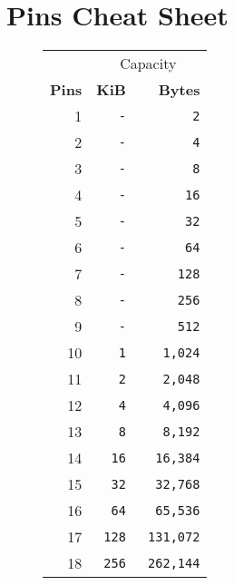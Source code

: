 \chapter{Pins Cheat Sheet}


\begin{figure}[H]
\begin{minipage}[t]{0.49\linewidth}
{ 
\setlength{\tabcolsep}{3.0pt}
\setlength\cmidrulewidth{\heavyrulewidth} %
\begin{tabular}{rrr}

  & \multicolumn{2}{c}{Capacity} \\
  \cmidrule(lr){2-3}
  
 
  \textbf{Pins} & \textbf{KiB} & \textbf{Bytes}\\               
            
  \toprule    
1            &    \texttt{-} &      \texttt{2}   \\
2   &\texttt{-}            &      \texttt{4}   \\
3  &    \texttt{-} &      \texttt{8}   \\
4  &\texttt{-}            &      \texttt{16}   \\
5  &    \texttt{-} &      \texttt{32}   \\
6   &    \texttt{-} &      \texttt{64}   \\
7   &    \texttt{-} &      \texttt{128}   \\
8            &    \texttt{-} &      \texttt{256}   \\
9           &    \texttt{-} &      \texttt{512}   \\
10   &    \texttt{1}           &      \texttt{1,024} \\
11   &    \texttt{2}           &\texttt{2,048}    \\
12   &    \texttt{4}           &      \texttt{4,096} \\
13   &    \texttt{8}          &      \texttt{8,192} \\
14            &    \texttt{16}           &      \texttt{16,384} \\
15  &    \texttt{32}           &\texttt{32,768}    \\
16  &    \texttt{64}           &\texttt{65,536}    \\
17   &    \texttt{128}           &      \texttt{131,072} \\
18  &    \texttt{ 256}           &      \texttt{ 262,144} \\
  \toprule    
\end{tabular}%
}
\end{minipage}%
\begin{minipage}[t]{0.49\linewidth}
{ 
\setlength{\tabcolsep}{3.0pt}
\setlength\cmidrulewidth{\heavyrulewidth} %
\begin{tabular}{rrr}


\end{tabular}}
\end{minipage}
\end{figure}
